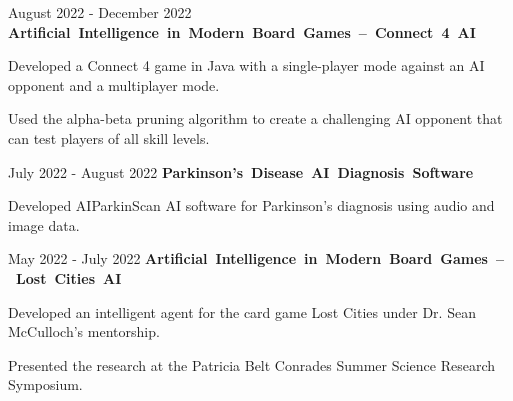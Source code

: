 \documentclass[10pt, letterpaper]{article}
\begin{document}
\vspace{\entrySpacing}\begin{twocolentry}{August 2022 - December 2022}
    \mbox{\textbf{Artificial Intelligence in Modern Board Games -- Connect 4 AI}}
\end{twocolentry}

\vspace{\highlightSpacing}
\begin{onecolentry}
    \begin{highlightsforbulletentries}
        \item Developed a Connect 4 game in Java with a single-player mode against an AI opponent and a multiplayer mode.
        \item Used the alpha-beta pruning algorithm to create a challenging AI opponent that can test players of all skill levels.
    \end{highlightsforbulletentries}
\end{onecolentry}

\vspace{\entrySpacing}\begin{twocolentry}{July 2022 - August 2022}
    \mbox{\textbf{Parkinson's Disease AI Diagnosis Software}}
\end{twocolentry}

\vspace{\highlightSpacing}
\begin{onecolentry}
    \begin{highlightsforbulletentries}
        \item Developed AIParkinScan AI software for Parkinson's diagnosis using audio and image data.
    \end{highlightsforbulletentries}
\end{onecolentry}

\vspace{\entrySpacing}\begin{twocolentry}{May 2022 - July 2022}
    \mbox{\textbf{Artificial Intelligence in Modern Board Games -- Lost Cities AI}}
\end{twocolentry}

\vspace{\highlightSpacing}
\begin{onecolentry}
    \begin{highlightsforbulletentries}
        \item Developed an intelligent agent for the card game Lost Cities under Dr. Sean McCulloch's mentorship.
        \item Presented the research at the Patricia Belt Conrades Summer Science Research Symposium.
    \end{highlightsforbulletentries}
\end{onecolentry}
\end{document}
